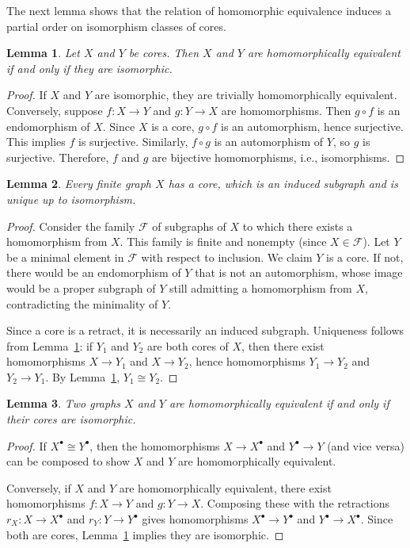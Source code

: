 \documentclass[12pt,a4paper,openany]{book}
\newtheorem{lemma}{Lemma}[section]
\begin{document}
The next lemma shows that the relation of homomorphic equivalence induces a partial order on isomorphism classes of cores.

\begin{lemma}\label{lem:core-partial-order}
Let $X$ and $Y$ be cores. Then $X$ and $Y$ are homomorphically equivalent if and only if they are isomorphic.
\end{lemma}
\begin{proof}
If $X$ and $Y$ are isomorphic, they are trivially homomorphically equivalent. Conversely, suppose $f: X \to Y$ and $g: Y \to X$ are homomorphisms. Then $g \circ f$ is an endomorphism of $X$. Since $X$ is a core, $g \circ f$ is an automorphism, hence surjective. This implies $f$ is surjective. Similarly, $f \circ g$ is an automorphism of $Y$, so $g$ is surjective. Therefore, $f$ and $g$ are bijective homomorphisms, i.e., isomorphisms.
\end{proof}

\begin{lemma}\label{lem:core-existence-uniqueness}
Every finite graph $X$ has a core, which is an induced subgraph and is unique up to isomorphism.
\end{lemma}
\begin{proof}
Consider the family $\mathcal{F}$ of subgraphs of $X$ to which there exists a homomorphism from $X$. This family is finite and nonempty (since $X \in \mathcal{F}$). Let $Y$ be a minimal element in $\mathcal{F}$ with respect to inclusion. We claim $Y$ is a core. If not, there would be an endomorphism of $Y$ that is not an automorphism, whose image would be a proper subgraph of $Y$ still admitting a homomorphism from $X$, contradicting the minimality of $Y$.

Since a core is a retract, it is necessarily an induced subgraph. Uniqueness follows from Lemma~\ref{lem:core-partial-order}: if $Y_1$ and $Y_2$ are both cores of $X$, then there exist homomorphisms $X \to Y_1$ and $X \to Y_2$, hence homomorphisms $Y_1 \to Y_2$ and $Y_2 \to Y_1$. By Lemma~\ref{lem:core-partial-order}, $Y_1 \cong Y_2$.
\end{proof}

\begin{lemma}\label{lem:hom-equivalence-cores}
Two graphs $X$ and $Y$ are homomorphically equivalent if and only if their cores are isomorphic.
\end{lemma}
\begin{proof}
If $X^\bullet \cong Y^\bullet$, then the homomorphisms $X \to X^\bullet$ and $Y^\bullet \to Y$ (and vice versa) can be composed to show $X$ and $Y$ are homomorphically equivalent.

Conversely, if $X$ and $Y$ are homomorphically equivalent, there exist homomorphisms $f: X \to Y$ and $g: Y \to X$. Composing these with the retractions $r_X: X \to X^\bullet$ and $r_Y: Y \to Y^\bullet$ gives homomorphisms $X^\bullet \to Y^\bullet$ and $Y^\bullet \to X^\bullet$. Since both are cores, Lemma~\ref{lem:core-partial-order} implies they are isomorphic.
\end{proof}
\end{document}
